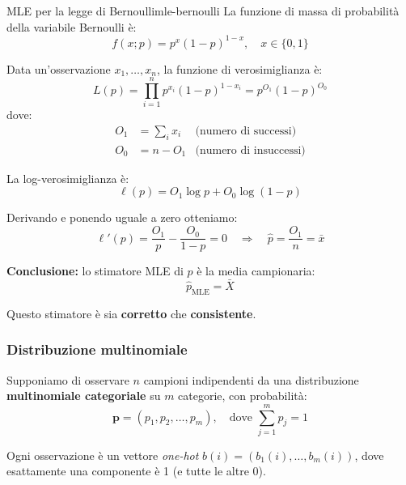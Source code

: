 \begin{esempio}{MLE per la legge di Bernoulli}{mle-bernoulli}
La funzione di massa di probabilità della variabile Bernoulli è:
\[
f(x; p) = p^x (1 - p)^{1 - x}, \quad x \in \{0, 1\}
\]

Data un'osservazione \( x_1, \dots, x_n \), la funzione di verosimiglianza è:
\[
L(p) = \prod_{i=1}^n p^{x_i}(1 - p)^{1 - x_i}
= p^{O_1}(1 - p)^{O_0}
\]
dove:
\begin{align*}
    O_1 &= \sum_i x_i &\text{(numero di successi)}\\
    O_0 &= n - O_1 &\text{(numero di insuccessi)}
\end{align*}

La log-verosimiglianza è:
\[
\ell(p) = O_1 \log p + O_0 \log(1 - p)
\]

Derivando e ponendo uguale a zero otteniamo:
\[
\ell'(p) = \frac{O_1}{p} - \frac{O_0}{1 - p} = 0
\quad \Rightarrow \quad
\hat{p} = \frac{O_1}{n} = \bar{x}
\]

\medskip
\textbf{Conclusione:} lo stimatore MLE di \( p \) è la media campionaria:
\[
\hat{p}_{\text{MLE}} = \bar{X}
\]

Questo stimatore è sia \textbf{corretto} che \textbf{consistente}.
\end{esempio}


\subsubsection{Distribuzione multinomiale}

Supponiamo di osservare \( n \) campioni indipendenti da una distribuzione \textbf{multinomiale categoriale} su \( m \) categorie, con probabilità:
\[
\boldsymbol{p} = (p_1, p_2, \dots, p_m), \quad \text{dove } \sum_{j=1}^m p_j = 1
\]

Ogni osservazione è un vettore \emph{one-hot} \( b(i) = (b_1(i), \dots, b_m(i)) \), dove esattamente una componente è 1 (e tutte le altre 0).

